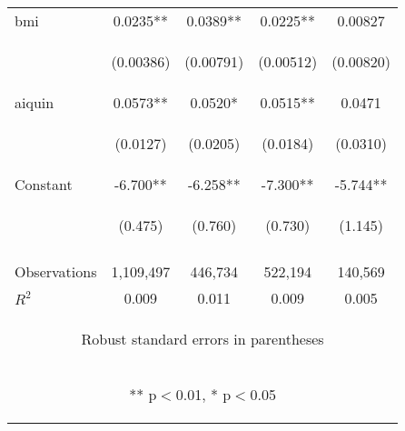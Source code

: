 \documentclass[]{article}
\begin{document}
\begin{center}
\begin{tabular}{lcccc}
bmi & 0.0235** & 0.0389** & 0.0225** & 0.00827 \\
\vspace{4pt} & \begin{footnotesize}(0.00386)\end{footnotesize} & \begin{footnotesize}(0.00791)\end{footnotesize} & \begin{footnotesize}(0.00512)\end{footnotesize} & \begin{footnotesize}(0.00820)\end{footnotesize} \\
aiquin & 0.0573** & 0.0520* & 0.0515** & 0.0471 \\
\vspace{4pt} & \begin{footnotesize}(0.0127)\end{footnotesize} & \begin{footnotesize}(0.0205)\end{footnotesize} & \begin{footnotesize}(0.0184)\end{footnotesize} & \begin{footnotesize}(0.0310)\end{footnotesize} \\
Constant & -6.700** & -6.258** & -7.300** & -5.744** \\
 & \begin{footnotesize}(0.475)\end{footnotesize} & \begin{footnotesize}(0.760)\end{footnotesize} & \begin{footnotesize}(0.730)\end{footnotesize} & \begin{footnotesize}(1.145)\end{footnotesize} \\
\vspace{4pt} & \begin{footnotesize}\end{footnotesize} & \begin{footnotesize}\end{footnotesize} & \begin{footnotesize}\end{footnotesize} & \begin{footnotesize}\end{footnotesize} \\
Observations & 1,109,497 & 446,734 & 522,194 & 140,569 \\
 $R^2$ & 0.009 & 0.011 & 0.009 & 0.005 \\ \hline
\multicolumn{5}{c}{\begin{footnotesize} Robust standard errors in parentheses\end{footnotesize}} \\
\multicolumn{5}{c}{\begin{footnotesize} ** p$<$0.01, * p$<$0.05\end{footnotesize}} \\
\end{tabular}
\end{center}
\end{document}
